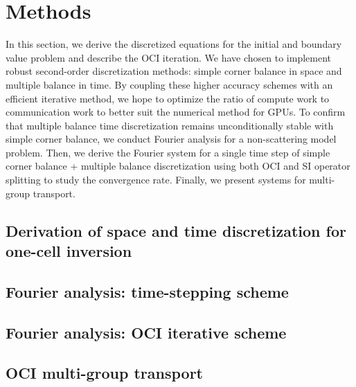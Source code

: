 \section{Methods}

In this section, we derive the discretized equations for the initial and boundary value problem and describe the OCI iteration.
We have chosen to implement robust second-order discretization methods: simple corner balance  \cite{adams_subcell_1997} in space and multiple balance \cite{variansyah_robust_2021} in time.
By coupling these higher accuracy schemes with an efficient iterative method, we hope to optimize the ratio of compute work to communication work to better suit the numerical method for GPUs.
To confirm that multiple balance time discretization remains unconditionally stable with simple corner balance, we conduct Fourier analysis for a non-scattering model problem.
Then, we derive the Fourier system for a single time step of simple corner balance + multiple balance discretization using both OCI and SI operator splitting to study the convergence rate.
Finally, we present systems for multi-group transport.

\subsection{Derivation of space and time discretization for one-cell inversion}
\label{sec:methods-derv}


\subsection{Fourier analysis: time-stepping scheme}



\subsection{Fourier analysis: OCI iterative scheme}
\label{sec:methods-faoci}


\subsection{OCI multi-group transport}


